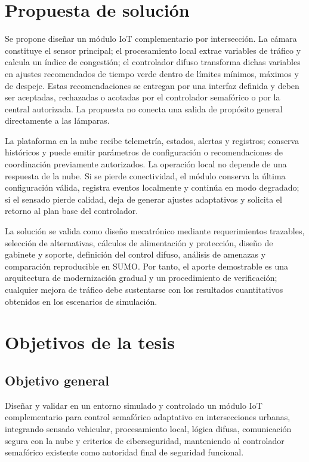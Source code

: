 \documentclass[12pt,a4paper,oneside]{report}
\begin{document}
\section{Propuesta de solución}\label{propuesta-de-soluciuxf3n}

Se propone diseñar un módulo IoT complementario por intersección. La cámara constituye el sensor principal; el procesamiento local extrae variables de tráfico y calcula un índice de congestión; el controlador difuso transforma dichas variables en ajustes recomendados de tiempo verde dentro de límites mínimos, máximos y de despeje. Estas recomendaciones se entregan por una interfaz definida y deben ser aceptadas, rechazadas o acotadas por el controlador semafórico o por la central autorizada. La propuesta no conecta una salida de propósito general directamente a las lámparas.

La plataforma en la nube recibe telemetría, estados, alertas y registros; conserva históricos y puede emitir parámetros de configuración o recomendaciones de coordinación previamente autorizados. La operación local no depende de una respuesta de la nube. Si se pierde conectividad, el módulo conserva la última configuración válida, registra eventos localmente y continúa en modo degradado; si el sensado pierde calidad, deja de generar ajustes adaptativos y solicita el retorno al plan base del controlador.

La solución se valida como diseño mecatrónico mediante requerimientos trazables, selección de alternativas, cálculos de alimentación y protección, diseño de gabinete y soporte, definición del control difuso, análisis de amenazas y comparación reproducible en SUMO. Por tanto, el aporte demostrable es una arquitectura de modernización gradual y un procedimiento de verificación; cualquier mejora de tráfico debe sustentarse con los resultados cuantitativos obtenidos en los escenarios de simulación.

\section{Objetivos de la tesis}\label{objetivos-del-proyecto-de-tesis}

\subsection{Objetivo general}\label{objetivo-general}

Diseñar y validar en un entorno simulado y controlado un módulo IoT complementario para control semafórico adaptativo en intersecciones urbanas, integrando sensado vehicular, procesamiento local, lógica difusa, comunicación segura con la nube y criterios de ciberseguridad, manteniendo al controlador semafórico existente como autoridad final de seguridad funcional.
\end{document}
